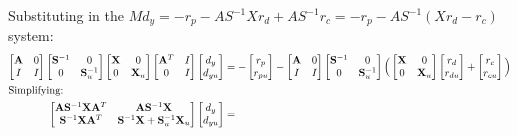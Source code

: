 \documentclass[10pt,a4paper]{article}
\begin{document}
Substituting in the $Md_y = -r_p - AS^{-1}Xr_d + AS^{-1}r_c = -r_p -  AS^{-1}(Xr_d - r_c)$ system:
\begin{align*}
\begin{bmatrix}\mathbf{A} & 0 \\ I & I\end{bmatrix}
\begin{bmatrix}\mathbf{S}^{-1} & 0 \\ 0 & \mathbf{S}_u^{-1}\end{bmatrix}
\begin{bmatrix}\mathbf{X} & 0 \\ 0 & \mathbf{X}_u\end{bmatrix}
\begin{bmatrix}\mathbf{A}^T & I \\ 0 & I\end{bmatrix}
\begin{bmatrix}d_y \\ d_{yu}\end{bmatrix} &=
-\begin{bmatrix}r_p \\ r_{pu}\end{bmatrix}
- \begin{bmatrix}\mathbf{A} & 0 \\ I & I\end{bmatrix}
\begin{bmatrix}\mathbf{S}^{-1} & 0 \\ 0 & \mathbf{S}_u^{-1}\end{bmatrix}
\Big(
	\begin{bmatrix}\mathbf{X} & 0 \\ 0 & \mathbf{X}_u\end{bmatrix}
	\begin{bmatrix}r_d \\ r_{du}\end{bmatrix}
	+ \begin{bmatrix}r_c \\ r_{cu}\end{bmatrix}
\Big) \\
\intertext{Simplifying:}
\begin{bmatrix}
	\mathbf{A}\mathbf{S}^{-1}\mathbf{X}\mathbf{A}^T & \mathbf{A}\mathbf{S}^{-1}\mathbf{X} \\
	\mathbf{S}^{-1}\mathbf{X}\mathbf{A}^T & \mathbf{S}^{-1}\mathbf{X}+\mathbf{S}_u^{-1}\mathbf{X}_u
\end{bmatrix}
\begin{bmatrix}d_y \\ d_{yu}\end{bmatrix} &=

\end{align*}
\end{document}
